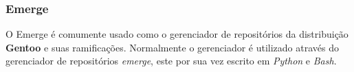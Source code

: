 \subsubsection{Emerge} %
\label{ssub:emerge}

O Emerge é comumente usado como o gerenciador de repositórios da distribuição \textbf{Gentoo} e suas ramificações. Normalmente o gerenciador é utilizado através do gerenciador de repositórios \textit{emerge}, este por sua vez escrito em \textit{Python} e \textit{Bash}.